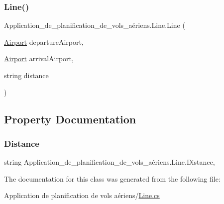 \subsubsection{\texorpdfstring{Line()}{Line()}}
{\footnotesize\ttfamily Application\+\_\+de\+\_\+planification\+\_\+de\+\_\+vols\+\_\+aériens.\+Line.\+Line (\begin{DoxyParamCaption}\item[{\hyperlink{class_application__de__planification__de__vols__a_xC3_xA9riens_1_1_airport}{Airport}}]{departure\+Airport,  }\item[{\hyperlink{class_application__de__planification__de__vols__a_xC3_xA9riens_1_1_airport}{Airport}}]{arrival\+Airport,  }\item[{string}]{distance }\end{DoxyParamCaption})}



\subsection{Property Documentation}
\mbox{\label{class_application__de__planification__de__vols__a_xC3_xA9riens_1_1_line_ab20aa426dca4af775b0029f44c9b607d}} 
\subsubsection{\texorpdfstring{Distance}{Distance}}
{\footnotesize\ttfamily string Application\+\_\+de\+\_\+planification\+\_\+de\+\_\+vols\+\_\+aériens.\+Line.\+Distance\hspace{0.3cm}{\ttfamily [get]}, {\ttfamily [set]}}



The documentation for this class was generated from the following file\+:\begin{DoxyCompactItemize}
\item 
Application de planification de vols aériens/\hyperlink{_line_8cs}{Line.\+cs}\end{DoxyCompactItemize}
